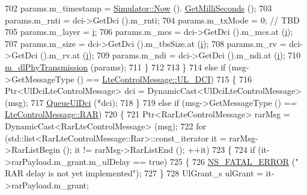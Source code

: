 \begin{DoxyCode}
702                   params.m\_timestamp = \hyperlink{classns3_1_1Simulator_ac3178fa975b419f7875e7105be122800}{Simulator::Now} ().
      \hyperlink{classns3_1_1Time_aba3428a8b6c4c8d9014ce44145081f34}{GetMilliSeconds} ();
703                   params.m\_rnti = dci->GetDci ().m\_rnti;
704                   params.m\_txMode = 0; \textcolor{comment}{// TBD}
705                   params.m\_layer = \hyperlink{bernuolliDistribution_8m_a6f6ccfcf58b31cb6412107d9d5281426}{i};
706                   params.m\_mcs = dci->GetDci ().m\_mcs.at (\hyperlink{bernuolliDistribution_8m_a6f6ccfcf58b31cb6412107d9d5281426}{i});
707                   params.m\_size = dci->GetDci ().m\_tbsSize.at (\hyperlink{bernuolliDistribution_8m_a6f6ccfcf58b31cb6412107d9d5281426}{i});
708                   params.m\_rv = dci->GetDci ().m\_rv.at (\hyperlink{bernuolliDistribution_8m_a6f6ccfcf58b31cb6412107d9d5281426}{i});
709                   params.m\_ndi = dci->GetDci ().m\_ndi.at (\hyperlink{bernuolliDistribution_8m_a6f6ccfcf58b31cb6412107d9d5281426}{i});
710                   \hyperlink{classns3_1_1LteEnbPhy_af17fb1bef18925f674f062e996135955}{m\_dlPhyTransmission} (params);
711                 \}
712 
713             \}
714           \textcolor{keywordflow}{else} \textcolor{keywordflow}{if} (msg->GetMessageType () == \hyperlink{classns3_1_1LteControlMessage_a9f9798d5aa8ad40f6432285b4b06135bab9cab20479fe8288477132799afcab91}{LteControlMessage::UL\_DCI})
715             \{
716               Ptr<UlDciLteControlMessage> dci = DynamicCast<UlDciLteControlMessage> (msg);
717               \hyperlink{classns3_1_1LteEnbPhy_a95bdedc1bcc58b79f4d1e26080cdf3f2}{QueueUlDci} (*dci);
718             \}
719           \textcolor{keywordflow}{else} \textcolor{keywordflow}{if} (msg->GetMessageType () == \hyperlink{classns3_1_1LteControlMessage_a9f9798d5aa8ad40f6432285b4b06135ba32e0d29cd217b256852ae7e843c932ed}{LteControlMessage::RAR})
720             \{
721               Ptr<RarLteControlMessage> rarMsg = DynamicCast<RarLteControlMessage> (msg);
722               \textcolor{keywordflow}{for} (std::list<RarLteControlMessage::Rar>::const\_iterator it = rarMsg->RarListBegin (); it !=
       rarMsg->RarListEnd (); ++it)
723                 \{
724                   \textcolor{keywordflow}{if} (it->rarPayload.m\_grant.m\_ulDelay == \textcolor{keyword}{true})
725                     \{
726                       \hyperlink{group__fatal_ga5131d5e3f75d7d4cbfd706ac456fdc85}{NS\_FATAL\_ERROR} (\textcolor{stringliteral}{" RAR delay is not yet implemented"});
727                     \}
728                   UlGrant\_s ulGrant = it->rarPayload.m\_grant;

\end{DoxyCode}
